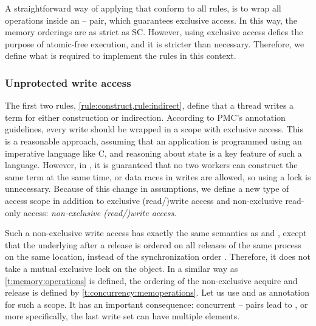 A straightforward way of applying  that conform to all rules, is to wrap all operations inside an -- pair, which guarantees exclusive access.
In this way, the memory orderings are as strict as \acl{SC}.
However, using exclusive access defies the purpose of atomic-free execution, and it is stricter than necessary.
Therefore, we define what is required to implement the rules in this context.

\subsubsection{Unprotected write access}

The first two rules, \cref{rule:construct,rule:indirect}, define that a thread writes a term for either construction or indirection.
According to \ac{PMC}'s annotation guidelines, every write should be wrapped in a scope with exclusive access.
This is a reasonable approach, assuming that an application is programmed using an imperative language like C, and reasoning about state is a key feature of such a language.
However, in \ourfp, it is guaranteed that no two workers can construct the same term at the same time, or data races in writes are allowed, so using a lock is unnecessary.
Because of this change in assumptions, we define a new type of access scope in addition to exclusive (read/)write access and non-exclusive read-only access: \emph{non-exclusive (read/)write access}.

Such a non-exclusive write access has exactly the same semantics as  and , except that the underlying  after a release is ordered \SYMorderprog* on all releases of the same process on the same location, instead of the synchronization order \SYMordersync*.
Therefore, it does not take a mutual exclusive lock on the object.
In a similar way as \vref{t:memory:operations} is defined, the ordering of the non-exclusive acquire and release is defined by \vref{t:concurrency:memoperations}.
Let us use  and  as annotation for such a scope.
It has an important consequence: concurrent -- pairs lead to , or more specifically, the last write set \SYMlastwrite* can have multiple elements.

